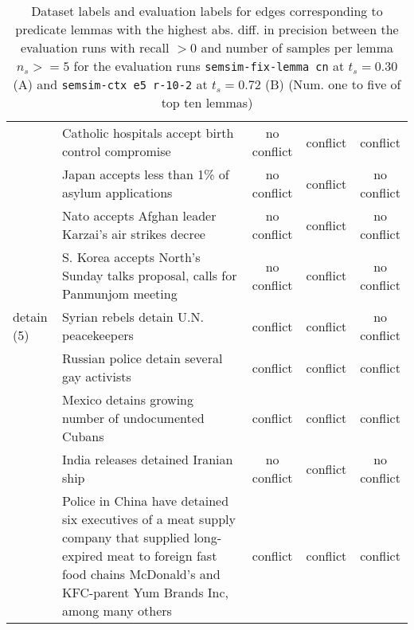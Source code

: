 \begin{sidewaystable}[htp]
\begin{tabular}{l p{13cm} ccc}
& Catholic hospitals accept birth control compromise & no conflict & conflict & conflict \\
& Japan accepts less than 1\% of asylum applications & no conflict & conflict & no conflict \\
& Nato accepts Afghan leader Karzai's air strikes decree & no conflict & conflict & no conflict \\
& S. Korea accepts North's Sunday talks proposal, calls for Panmunjom meeting & no conflict & conflict & no conflict \\
\hline
detain (5)
& Syrian rebels detain U.N. peacekeepers & conflict & conflict & no conflict \\
& Russian police detain several gay activists & conflict & conflict & conflict \\
& Mexico detains growing number of undocumented Cubans & conflict & conflict & conflict \\
& India releases detained Iranian ship & no conflict & conflict & no conflict \\
& Police in China have detained six executives of a meat supply company that supplied long-expired meat to foreign fast food chains McDonald’s and KFC-parent Yum Brands Inc, among many others & conflict & conflict & conflict \\
\bottomrule
\end{tabular}
\caption{Dataset labels and evaluation labels for edges corresponding to predicate lemmas with the highest abs. diff. in precision between the evaluation runs with recall \(> 0\) and number of samples per lemma \(n_s >= 5\) for the evaluation runs \texttt{semsim-fix-lemma cn} at \(t_s = 0.30\) (A) and \texttt{semsim-ctx e5 r-10-2} at \(t_s = 0.72\) (B)  (Num. one to five of top ten lemmas)}
\label{tab:ples-labels-1}
\end{sidewaystable}


